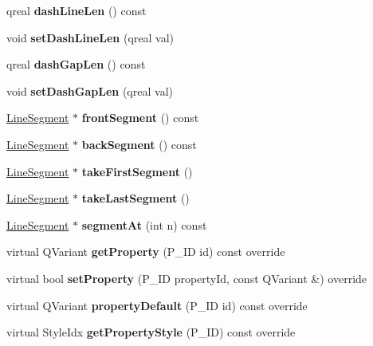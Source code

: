 \begin{DoxyCompactItemize}
qreal {\bfseries dash\+Line\+Len} () const
\item 
\mbox{\label{class_ms_1_1_s_line_a992da751399ed22230d3d82e559a8e97}} 
void {\bfseries set\+Dash\+Line\+Len} (qreal val)
\item 
\mbox{\label{class_ms_1_1_s_line_ae55a12c73b4f29935f368808c66b9d40}} 
qreal {\bfseries dash\+Gap\+Len} () const
\item 
\mbox{\label{class_ms_1_1_s_line_a95b34c648377f6d7d75d8ffdbb673473}} 
void {\bfseries set\+Dash\+Gap\+Len} (qreal val)
\item 
\mbox{\label{class_ms_1_1_s_line_a76acc07cd6a6a5d77019ad819a7f0195}} 
\hyperlink{class_ms_1_1_line_segment}{Line\+Segment} $\ast$ {\bfseries front\+Segment} () const
\item 
\mbox{\label{class_ms_1_1_s_line_ae817eb3d8fc6aba01ecb63b9d36a94b1}} 
\hyperlink{class_ms_1_1_line_segment}{Line\+Segment} $\ast$ {\bfseries back\+Segment} () const
\item 
\mbox{\label{class_ms_1_1_s_line_ae35eb496ab3b6f75a7afc0bbfe88556a}} 
\hyperlink{class_ms_1_1_line_segment}{Line\+Segment} $\ast$ {\bfseries take\+First\+Segment} ()
\item 
\mbox{\label{class_ms_1_1_s_line_a70d8edd3e219ab247cea117468938f65}} 
\hyperlink{class_ms_1_1_line_segment}{Line\+Segment} $\ast$ {\bfseries take\+Last\+Segment} ()
\item 
\mbox{\label{class_ms_1_1_s_line_aa824bc657c25fbfb877230eb7663d083}} 
\hyperlink{class_ms_1_1_line_segment}{Line\+Segment} $\ast$ {\bfseries segment\+At} (int n) const
\item 
\mbox{\label{class_ms_1_1_s_line_a1e14d88e8f9067816624fc2c41ebb72f}} 
virtual Q\+Variant {\bfseries get\+Property} (P\+\_\+\+ID id) const override
\item 
\mbox{\label{class_ms_1_1_s_line_ae35b6d275132fe4e9fd1eabdce08f17e}} 
virtual bool {\bfseries set\+Property} (P\+\_\+\+ID property\+Id, const Q\+Variant \&) override
\item 
\mbox{\label{class_ms_1_1_s_line_a6a1db6412713189447e22c3ddedb519c}} 
virtual Q\+Variant {\bfseries property\+Default} (P\+\_\+\+ID id) const override
\item 
\mbox{\label{class_ms_1_1_s_line_a3ded57353a7cc60fd7156b788a0b3c7a}} 
virtual Style\+Idx {\bfseries get\+Property\+Style} (P\+\_\+\+ID) const override
\end{DoxyCompactItemize}
